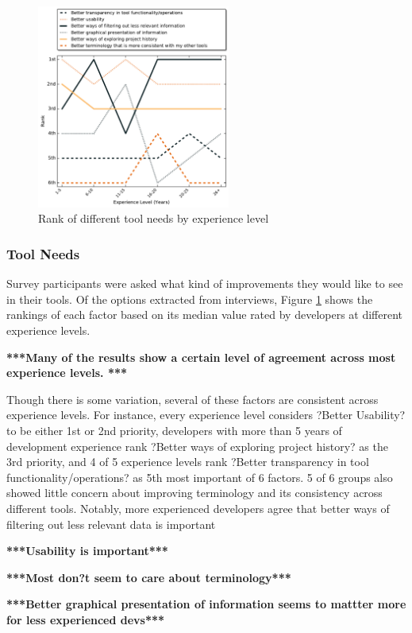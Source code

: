 \documentclass[conference]{IEEEtran}
\begin{document}
\begin{figure}[!t]
\centering
\includegraphics[width=2.5in]{ExpVsRankToolNeeds.pdf}
\caption{Rank of different tool needs by experience level}
\label{tool_needs_rank}
\end{figure}

\subsubsection{Tool Needs}
Survey participants were asked what kind of improvements they would like to see in their tools. Of the options extracted from interviews, Figure \ref{tool_needs_rank} shows the rankings of each factor based on its median value rated by developers at different experience levels.

\textbf{***Many of the results show a certain level of agreement across most experience levels. ***}

Though there is some variation, several of these factors are consistent across experience levels. For instance, every experience level considers ?Better Usability? to be either 1st or 2nd priority, developers with more than 5 years of development experience rank ?Better ways of exploring project history? as the 3rd priority, and 4 of 5 experience levels rank ?Better transparency in tool functionality/operations? as 5th most important of 6 factors. 5 of 6 groups also showed little concern about improving terminology and its consistency across different tools.
Notably, more experienced developers agree that better ways of filtering out less relevant data is important

\textbf{***Usability is important***}

\textbf{***Most don?t seem to care about terminology***}

\textbf{***Better graphical presentation  of information seems to mattter more for less experienced devs***}
\end{document}
